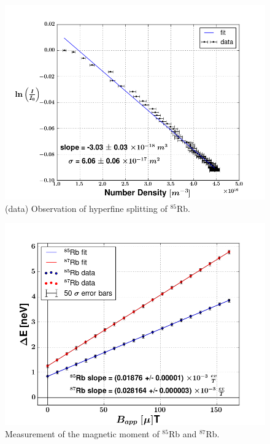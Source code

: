 \documentclass[aps,prl,twocolumn,groupedaddress]{revtex4-1}
\begin{document}
\begin{figure}
\includegraphics[width=\columnwidth]{rb-absorption-xsection.png}
\caption{\label{HyperFineSplit} (data) Observation of hyperfine splitting of $^{85}$Rb.}
\end{figure}

\begin{figure}
\includegraphics[width=\columnwidth]{magmom-verterr.png}
\caption{\label{MagMom} Measurement of the magnetic moment of $^{85}$Rb and $^{87}$Rb.}
\end{figure}
\end{document}
